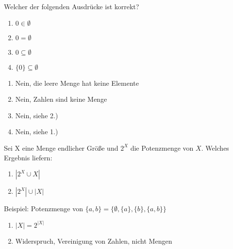 \begin{card}
	Welcher der folgenden Ausdrücke ist korrekt?
	\begin{enumerate}
	\item $0 \in \emptyset$
	\item $0 = \emptyset$
	\item $0 \subseteq \emptyset$
	\item $\{0\} \subseteq \emptyset$
	\end{enumerate}
	\hr
	\begin{enumerate}
	\item Nein, die leere Menge hat keine Elemente
	\item Nein, Zahlen sind keine Menge
	\item Nein, siehe 2.)
	\item Nein, siehe 1.)
	\end{enumerate}
\end{card}

\begin{card}
	Sei X eine Menge endlicher Größe und $2^X$ die Potenzmenge von $X$. Welches Ergebnis liefern:
	\begin{enumerate}
	\item $|2^X \cup X|$
	\item $|2^X| \cup |X|$
	\end{enumerate}
	\hr
	Beispiel: Potenzmenge  von $\{ a,b \} = \{ \emptyset, \{ a \}, \{ b \} , \{ a,b \} \}$
	\begin{enumerate}
	\item $|X| = 2^{|X|}$
	\item Widerspruch, Vereinigung von Zahlen, nicht Mengen
	\end{enumerate}
\end{card}

\begin{card}
\end{card}

\begin{card}
\end{card}

\begin{card}
\end{card}